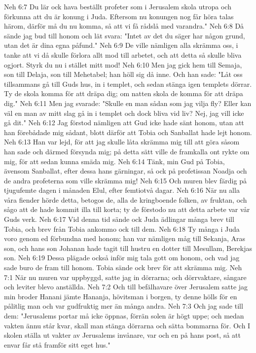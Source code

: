 Neh 6:7  Du lär ock hava beställt profeter som i Jerusalem skola utropa och förkunna att du är konung i Juda. Eftersom nu konungen nog får höra talas härom, därför må du nu komma, så att vi få rådslå med varandra."
Neh 6:8  Då sände jag bud till honom och lät svara: "Intet av det du säger har någon grund, utan det är dina egna påfund."
Neh 6:9  De ville nämligen alla skrämma oss, i tanke att vi då skulle förlora allt mod till arbetet, och att detta så skulle bliva ogjort. Styrk du nu i stället mitt mod!
Neh 6:10  Men jag gick hem till Semaja, son till Delaja, son till Mehetabel; han höll sig då inne. Och han sade: "Låt oss tillsammans gå till Guds hus, in i templet, och sedan stänga igen templets dörrar. Ty de skola komma för att dräpa dig; om natten skola de komma för att dräpa dig."
Neh 6:11  Men jag svarade: "Skulle en man sådan som jag vilja fly? Eller kan väl en man av mitt slag gå in i templet och dock bliva vid liv? Nej, jag vill icke gå dit."
Neh 6:12  Jag förstod nämligen att Gud icke hade sänt honom, utan att han förebådade mig sådant, blott därför att Tobia och Sanballat hade lejt honom.
Neh 6:13  Han var lejd, för att jag skulle låta skrämma mig till att göra såsom han sade och därmed försynda mig; på detta sätt ville de framkalla ont rykte om mig, för att sedan kunna smäda mig.
Neh 6:14  Tänk, min Gud på Tobia, ävensom Sanballat, efter dessa hans gärningar, så ock på profetissan Noadja och de andra profeterna som ville skrämma mig!
Neh 6:15  Och muren blev färdig på tjugufemte dagen i månaden Elul, efter femtiotvå dagar.
Neh 6:16  När nu alla våra fiender hörde detta, betogos de, alla de kringboende folken, av fruktan, och sågo att de hade kommit illa till korta; ty de förstodo nu att detta arbete var vår Guds verk.
Neh 6:17  Vid denna tid sände ock Juda ädlingar många brev till Tobia, och brev från Tobia ankommo ock till dem.
Neh 6:18  Ty många i Juda voro genom ed förbundna med honom; han var nämligen måg till Sekanja, Aras son, och hans son Johanan hade tagit till hustru en dotter till Mesullam, Berekjas son.
Neh 6:19  Dessa plägade också inför mig tala gott om honom, och vad jag sade buro de fram till honom. Tobia sände ock brev för att skrämma mig.
Neh 7:1  När nu muren var uppbyggd, satte jag in dörrarna; och dörrvaktare, sångare och leviter blevo anställda.
Neh 7:2  Och till befälhavare över Jerusalem satte jag min broder Hanani jämte Hananja, hövitsman i borgen, ty denne hölls för en pålitlig man och var gudfruktig mer än många andra.
Neh 7:3  Och jag sade till dem: "Jerusalems portar må icke öppnas, förrän solen är högt uppe; och medan vakten ännu står kvar, skall man stänga dörrarna och sätta bommarna för. Och I skolen ställa ut vakter av Jerusalems invånare, var och en på hans post, så att envar får stå framför sitt eget hus."

